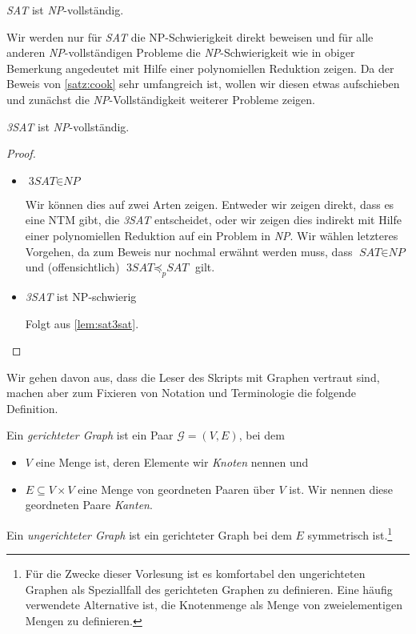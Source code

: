 \begin{Satz}[Cook]\label{satz:cook}
	\textit{SAT} ist \textit{NP}-vollständig.
\end{Satz}
Wir werden nur für \textit{SAT} die NP-Schwierigkeit direkt beweisen und für alle anderen \textit{NP}-vollständigen Probleme die \textit{NP}-Schwierigkeit wie in obiger Bemerkung angedeutet mit Hilfe einer polynomiellen Reduktion zeigen.
Da der Beweis von \autoref{satz:cook} sehr umfangreich ist, wollen wir diesen etwas aufschieben und zunächst die \textit{NP}-Vollständigkeit weiterer Probleme zeigen.


\begin{Satz}[name={[\textit{3SAT} ist \textit{NP}-vollständig]}]
	\textit{3SAT} ist \textit{NP}-vollständig.
\end{Satz}
\begin{proof}
 \
 \begin{itemize}
  \item $\textit{3SAT}\in \textit{NP}$
  
  Wir können dies auf zwei Arten zeigen. 
  Entweder wir zeigen direkt, dass es eine \ac{NTM} gibt, die \textit{3SAT} entscheidet, oder 
  wir zeigen dies indirekt mit Hilfe einer polynomiellen Reduktion auf ein Problem in \textit{NP}.
  Wir wählen letzteres Vorgehen, da zum Beweis nur nochmal erwähnt werden muss, dass $\textit{SAT}\in \textit{NP}$ und (offensichtlich) $\textit{3SAT}\preceq_p \textit{SAT}$ gilt.
  
  \item \textit{3SAT} ist NP-schwierig
  
  Folgt aus \autoref{lem:sat3sat}.\qedhere
 \end{itemize}
\end{proof}


Wir gehen davon aus, dass die Leser des Skripts mit Graphen vertraut sind, machen aber zum Fixieren von Notation und Terminologie die folgende Definition.
\begin{Def}
 Ein \emph{gerichteter Graph} ist ein Paar $\mathcal{G}=(V,E)$, bei dem
 \begin{itemize}
  \item $V$ eine Menge ist, deren Elemente wir \emph{Knoten} nennen und
  \item $E\subseteq V\times V$ eine Menge von geordneten Paaren über $V$ ist. 
  Wir nennen diese geordneten Paare \emph{Kanten}.
 \end{itemize}
 Ein \emph{ungerichteter Graph} ist ein gerichteter Graph bei dem $E$ symmetrisch ist.\footnote{
 Für die Zwecke dieser Vorlesung ist es komfortabel den ungerichteten Graphen als Speziallfall des gerichteten Graphen zu definieren. 
 Eine häufig verwendete Alternative ist, die Knotenmenge als Menge von zweielementigen Mengen zu definieren.}
\end{Def}



